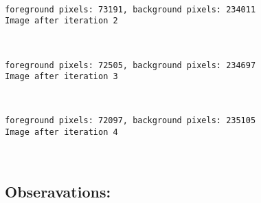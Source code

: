 \documentclass[11pt]{article}
\begin{document}
    \begin{center}
    \end{center}
    { \hspace*{\fill} \\}
    
    \begin{Verbatim}[commandchars=\\\{\}]
foreground pixels: 73191, background pixels: 234011
Image after iteration 2

    \end{Verbatim}

    \begin{center}
    \end{center}
    { \hspace*{\fill} \\}
    
    \begin{Verbatim}[commandchars=\\\{\}]
foreground pixels: 72505, background pixels: 234697
Image after iteration 3

    \end{Verbatim}

    \begin{center}
    \end{center}
    { \hspace*{\fill} \\}
    
    \begin{Verbatim}[commandchars=\\\{\}]
foreground pixels: 72097, background pixels: 235105
Image after iteration 4

    \end{Verbatim}

    \begin{center}
    \end{center}
    { \hspace*{\fill} \\}
    
    \hypertarget{obseravations}{%
\subsection{Obseravations:}\label{obseravations}}
\end{document}
